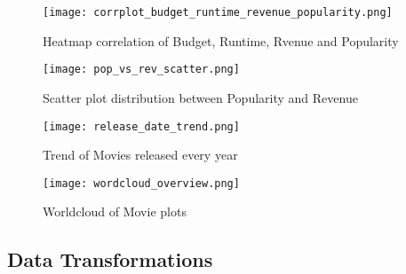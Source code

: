 \documentclass[conference]{IEEEtran}
\begin{document}
\begin{figure}[htbp]
    \centerline{\texttt{[image: corrplot\_budget\_runtime\_revenue\_popularity.png]}}
    \caption{Heatmap correlation of Budget, Runtime, Rvenue and Popularity}
    \label{fig:enter-label}
\end{figure}    

\begin{figure}[htbp]
    \centerline{\texttt{[image: pop\_vs\_rev\_scatter.png]}}
    \caption{Scatter plot distribution between Popularity and Revenue}
    \label{fig:enter-label}
\end{figure}   

\begin{figure}[htbp]
    \centerline{\texttt{[image: release\_date\_trend.png]}}
    \caption{Trend of Movies released every year}
    \label{fig:enter-label}
\end{figure}   

\begin{figure}[htbp]
    \centerline{\texttt{[image: wordcloud\_overview.png]}}
    \caption{Worldcloud of Movie plots}
    \label{fig:enter-label}
\end{figure}   

\newpage
\subsection{Data Transformations}
\end{document}
